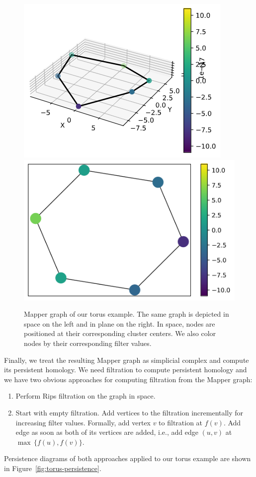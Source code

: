 \documentclass{article}
\begin{document}
\begin{figure}[ht]
    \centering
    \includegraphics[align=c, width=0.4\columnwidth]{torus-graph-3d}
    \includegraphics[align=c, width=0.4\columnwidth]{torus-graph-2d}
    \caption{Mapper graph of our torus example.
        The same graph is depicted in space on the left and in plane on the right.
        In space, nodes are positioned at their corresponding cluster centers.
        We also color nodes by their corresponding filter values.}
    \label{fig:torus-mapper}
\end{figure}

Finally, we treat the resulting Mapper graph as simplicial complex and compute its persistent homology.
We need filtration to compute persistent homology and we have two obvious approaches for computing filtration from the Mapper graph:
\begin{enumerate}
    \item Perform Rips filtration on the graph in space.
    \item Start with empty filtration.
          Add vertices to the filtration incrementally for increasing filter values.
          Formally, add vertex $v$ to filtration at $f(v)$.
          Add edge as soon as both of its vertices are added, i.e., add edge $(u, v)$ at $\max\,\{ f(u), f(v) \}$.
\end{enumerate}
Persistence diagrams of both approaches applied to our torus example are shown in Figure~\ref{fig:torus-persistence}.
\end{document}
